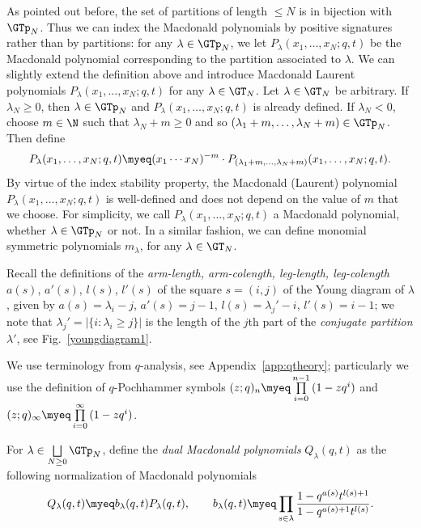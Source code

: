 As pointed out before, the set of partitions of length $\leq N$ is in bijection with $\GTp_N$. Thus we can index the Macdonald polynomials by positive signatures rather than by partitions: for any $\lambda\in\GTp_N$, we let $P_{\lambda}(x_1, \dots, x_N; q, t)$ be the Macdonald polynomial corresponding to the partition associated to $\lambda$. We can slightly extend the def\/inition above and introduce Macdonald Laurent polynomials $P_{\lambda}(x_1, \dots, x_N; q, t)$ for any $\lambda\in\GT_N$. Let $\lambda\in\GT_N$ be arbitrary. If $\lambda_N \geq 0$, then $\lambda\in\GTp_N$ and $P_{\lambda}(x_1, \dots, x_N; q, t)$ is already def\/ined. If $\lambda_N < 0$, choose $m\in\N$ such that $\lambda_N + m \geq 0$ and so $(\lambda_1 + m, \dots, \lambda_N + m)\in\GTp_N$. Then def\/ine
\begin{gather}\label{macdonaldsignatures11}
P_{\lambda}(x_1, \dots, x_N; q, t) \myeq (x_1\cdots x_N)^{-m}\cdot P_{(\lambda_1 + m, \dots, \lambda_N + m)}(x_1, \dots, x_N; q, t).
\end{gather}
By virtue of the index stability property, the Macdonald (Laurent) polynomial $P_{\lambda}(x_1, \dots, x_N; q, t)$ is well-def\/ined and does not depend on the value of $m$ that we choose. For simplicity, we call $P_{\lambda}(x_1, \dots, x_N; q, t)$ a Macdonald polynomial, whether $\lambda\in\GTp_N$ or not. In a similar fashion, we can def\/ine monomial symmetric polynomials $m_{\lambda}$, for any $\lambda\in\GT_N$.

Recall the def\/initions of the \textit{arm-length, arm-colength, leg-length, leg-colength} $a(s)$, $a'(s)$, $l(s)$, $l'(s)$ of the square $s = (i, j)$ of the Young diagram of $\lambda$, given by $a(s) = \lambda_i - j$, $a'(s) = j - 1$, $l(s) = \lambda_j' - i$, $l'(s) = i - 1$;
we note that $\lambda_j' = |\{ i\colon \lambda_i \geq j \} |$ is the length of the $j$th part of the \textit{conjugate partition} $\lambda'$, see Fig.~\ref{youngdiagram1}.

We use terminology from $q$-analysis, see Appendix~\ref{app:qtheory}; particularly we use the def\/inition of $q$-Pochhammer symbols $(z; q)_n \myeq \prod\limits_{i=0}^{n-1}{(1 - zq^i)}$ and $(z; q)_{\infty} \myeq \prod\limits_{i=0}^{\infty}{(1 - zq^i)}$.

For $\lambda\in\bigsqcup\limits_{N\geq 0}{\GTp_N}$, def\/ine the \textit{dual Macdonald polynomials} $Q_{\lambda}(q, t)$ as the following normaliza\-tion of Macdonald polynomials
\begin{gather}\label{PtoQ}
Q_{\lambda}(q, t) \myeq b_{\lambda}(q, t)P_{\lambda}(q, t), \qquad b_{\lambda}(q, t) \myeq \prod_{s\in\lambda}{\frac{1 - q^{a(s)}t^{l(s) + 1}}{1 - q^{a(s) + 1}t^{l(s)}}}.
\end{gather}

